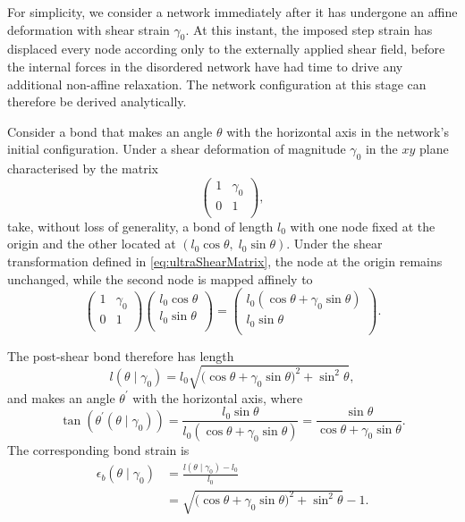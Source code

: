 \documentclass[asymmetricmargins]{library/duthesis}%
\begin{document}
For simplicity, we consider a network immediately after it has undergone an affine deformation with shear strain $\gamma_0$. At this instant, the imposed step strain has displaced every node according only to the externally applied shear field, before the internal forces in the disordered network have had time to drive any additional non-affine relaxation. The network configuration at this stage can therefore be derived analytically.

Consider a bond that makes an angle $\theta$ with the horizontal axis in the network’s initial configuration. Under a shear deformation of magnitude $\gamma_0$ in the $xy$ plane characterised by the matrix
\begin{equation}
    \left(\begin{matrix}
        1 & \gamma_0 \\
        0 & 1 \\
    \end{matrix}\right),
    \label{eq:ultraShearMatrix}
\end{equation}
take, without loss of generality, a bond of length $l_0$ with one node fixed at the origin and the other located at $(l_0 \cos\theta,\; l_0 \sin\theta)$. Under the shear transformation defined in \cref{eq:ultraShearMatrix}, the node at the origin remains unchanged, while the second node is mapped affinely to
\begin{equation*}
    \left(\begin{matrix}
        1 & \gamma_0 \\
        0 & 1 \\
    \end{matrix}\right)
    \left(\begin{matrix}
        l_0\cos\theta \\
        l_0\sin\theta \\
    \end{matrix}\right)
    =
    \left(\begin{matrix}
        l_0(\cos\theta + \gamma_0\sin\theta) \\
        l_0\sin\theta \\
    \end{matrix}\right).
\end{equation*}

The post-shear bond therefore has length
\begin{equation}
l(\theta \mid \gamma_0)
= l_0 \sqrt{\bigl(\cos\theta + \gamma_0 \sin\theta\bigr)^2 + \sin^2\theta},
\end{equation}
and makes an angle $\theta^\prime$ with the horizontal axis, where
\begin{equation}
\tan\left( \theta^\prime(\theta \mid \gamma_0) \right)
= \frac{l_0\sin\theta}{l_0(\cos\theta + \gamma_0\sin\theta)}
= \frac{\sin\theta}{\cos\theta + \gamma_0\sin\theta}.
\end{equation}
The corresponding bond strain is
\begin{align}
\epsilon_b(\theta \mid \gamma_0)
&= \frac{l(\theta \mid \gamma_0) - l_0}{l_0} \\
&= \sqrt{\bigl(\cos\theta + \gamma_0 \sin\theta\bigr)^2 + \sin^2\theta} - 1.
\end{align}
\end{document}

